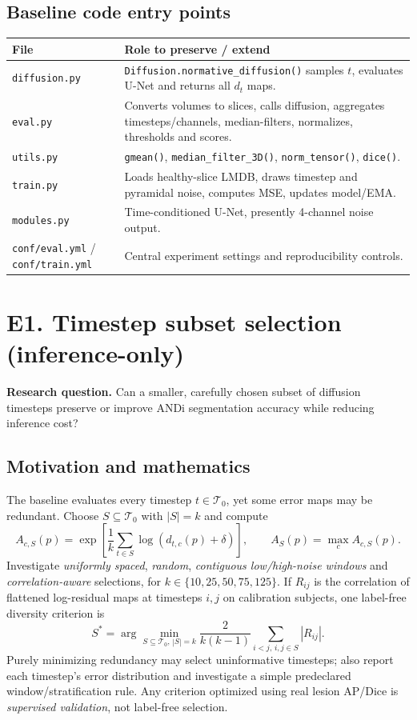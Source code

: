 \documentclass[10pt,a4paper]{article}
\newcommand{\file}[1]{\nolinkurl{#1}}
\newcommand{\hyps}[1]{\begin{summarybox}\textbf{Research question.} #1\end{summarybox}}
\begin{document}
\subsection{Baseline code entry points}
\begin{tabularx}{\linewidth}{@{}p{37mm}X@{}}
\toprule
File & Role to preserve / extend\\\midrule
\file{diffusion.py} & \file{Diffusion.normative_diffusion()} samples $t$, evaluates U-Net and returns all $d_t$ maps.\\
\file{eval.py} & Converts volumes to slices, calls diffusion, aggregates timesteps/channels, median-filters, normalizes, thresholds and scores.\\
\file{utils.py} & \file{gmean()}, \file{median_filter_3D()}, \file{norm_tensor()}, \file{dice()}.\\
\file{train.py} & Loads healthy-slice LMDB, draws timestep and pyramidal noise, computes MSE, updates model/EMA.\\
\file{modules.py} & Time-conditioned U-Net, presently 4-channel noise output.\\
\file{conf/eval.yml} / \file{conf/train.yml} & Central experiment settings and reproducibility controls.\\\bottomrule
\end{tabularx}
\newpage
\section{E1. Timestep subset selection (inference-only)}
\hyps{Can a smaller, carefully chosen subset of diffusion timesteps preserve or improve ANDi segmentation accuracy while reducing inference cost?}
\subsection{Motivation and mathematics}
The baseline evaluates every timestep $t\in\mathcal T_0$, yet some error maps may be redundant. Choose $S\subseteq\mathcal T_0$ with $|S|=k$ and compute
\begin{equation}
 A_{c,S}(p)=\exp\left[\frac1k\sum_{t\in S}\log(d_{t,c}(p)+\delta)\right],\qquad
 A_S(p)=\max_c A_{c,S}(p).
\end{equation}
Investigate \emph{uniformly spaced}, \emph{random}, \emph{contiguous low/high-noise windows} and \emph{correlation-aware} selections, for $k\in\{10,25,50,75,125\}$. If $R_{ij}$ is the correlation of flattened log-residual maps at timesteps $i,j$ on calibration subjects, one label-free diversity criterion is
\begin{equation}
 S^*=\arg\min_{S\subseteq\mathcal T_0,\,|S|=k}\frac{2}{k(k-1)}\sum_{i<j,\,i,j\in S}|R_{ij}|.
\end{equation}
Purely minimizing redundancy may select uninformative timesteps; also report each timestep's error distribution and investigate a simple predeclared window/stratification rule. Any criterion optimized using real lesion AP/Dice is \emph{supervised validation}, not label-free selection.
\end{document}
